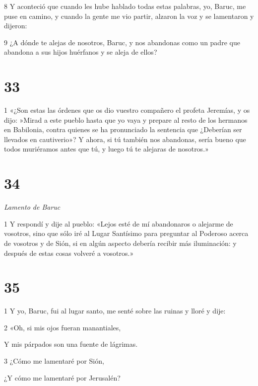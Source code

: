 \par 8 Y aconteció que cuando les hube hablado todas estas palabras, yo, Baruc, me puse en camino, y cuando la gente me vio partir, alzaron la voz y se lamentaron y dijeron:

\par 9 ¿A dónde te alejas de nosotros, Baruc, y nos abandonas como un padre que abandona a sus hijos huérfanos y se aleja de ellos?

\chapter{33}

\par 1 «¿Son estas las órdenes que os dio vuestro compañero el profeta Jeremías, y os dijo: »Mirad a este pueblo hasta que yo vaya y prepare al resto de los hermanos en Babilonia, contra quienes se ha pronunciado la sentencia que ¿Deberían ser llevados en cautiverio»? Y ahora, si tú también nos abandonas, sería bueno que todos muriéramos antes que tú, y luego tú te alejaras de nosotros.»

\chapter{34}

\par \textit{Lamento de Baruc}

\par 1 Y respondí y dije al pueblo: «Lejos esté de mí abandonaros o alejarme de vosotros, sino que sólo iré al Lugar Santísimo para preguntar al Poderoso acerca de vosotros y de Sión, si en algún aspecto debería recibir más iluminación: y después de estas cosas volveré a vosotros.»

\chapter{35}

\par 1 Y yo, Baruc, fui al lugar santo, me senté sobre las ruinas y lloré y dije:

\par 2 «Oh, si mis ojos fueran manantiales,

\par Y mis párpados son una fuente de lágrimas.

\par 3 ¿Cómo me lamentaré por Sión,

\par ¿Y cómo me lamentaré por Jerusalén?

